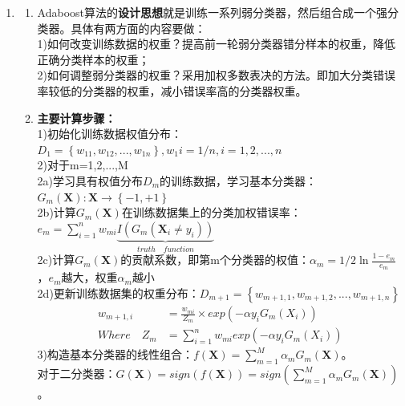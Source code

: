 \documentclass[a4paper,11pt,onecolumn,oneside,UTF8]{article}
\begin{document}
\begin{enumerate}
      \item
            \begin{enumerate}[(1)]
                  \item
                        Adaboost算法的\textbf{设计思想}就是训练一系列弱分类器，然后组合成一个强分类器。具体有两方面的内容要做：\\
                        1)如何改变训练数据的权重？提高前一轮弱分类器错分样本的权重，降低正确分类样本的权重；\\
                        2)如何调整弱分类器的权重？采用加权多数表决的方法。即加大分类错误率较低的分类器的权重，减小错误率高的分类器权重。\\
                  \item
                        \textbf{主要计算步骤：}\\
                        1)初始化训练数据权值分布：$D_1=\left\{w_{11},w_{12},...,w_{1n}\right\}, w_1i=1/n, i=1,2,...,n$\\
                        2)对于m=1,2,...,M\\
                        2a)学习具有权值分布$D_m$的训练数据，学习基本分类器：$G_m\left(\bm X\right): \bm X → \left\{-1,+1\right\}$\\
                        2b)计算$G_m\left(\bm X\right)$在训练数据集上的分类加权错误率：$e_m=\sum\limits_{i=1}^nw_{mi}\underbrace{I(G_m\left(\bm X_i\neq y_i\right))}_{truth\quad function}$\\
                        2c)计算$G_m\left(\bm X\right)$的贡献系数，即第m个分类器的权值：$\alpha_m=1/2\ln \frac{1-e_m}{e_m}$，$e_m$越大，权重$\alpha_m$越小\\
                        2d)更新训练数据集的权重分布：$D_{m+1}=\left\{w_{m+1,1},w_{m+1,2},...,w_{m+1,n}\right\}$\\
                        $$
                              \begin{aligned}
                                    w_{m+1,i}       & =\frac{w_{mi}}{Z_m}×exp\left(-\alpha y_iG_m\left(X_i\right)\right)       \\
                                    Where \quad Z_m & =\sum\limits_{i=1}^nw_{mi}exp\left(-\alpha y_iG_m\left(X_i\right)\right)
                              \end{aligned}
                        $$
                        3)构造基本分类器的线性组合：$f\left(\bm X\right)=\sum\limits_{m=1}^M\alpha_mG_m\left(\bm X\right)$。\\
                        对于二分类器：$G\left(\bm X\right)=sign\left(f\left(\bm X\right)\right)=sign\left(\sum\limits_{m=1}^M\alpha_mG_m\left(\bm X\right)\right)$。

\end{enumerate}
\end{enumerate}
\end{document}
